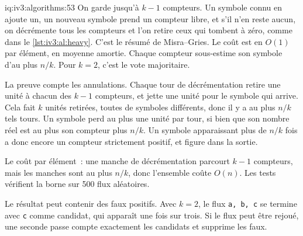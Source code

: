 \begin{solution}{iq:iv3:algorithms:53}
On garde jusqu'à $k - 1$ compteurs. Un symbole connu en ajoute un, un nouveau symbole prend un compteur libre, et s'il n'en reste aucun, on décrémente tous les compteurs et l'on retire ceux qui tombent à zéro, comme dans le \cref{lst:iv3:al:heavy}. C'est le résumé de Misra--Gries. Le coût est en $O(1)$ par élément, en moyenne amortie. Chaque compteur sous-estime son symbole d'au plus $n/k$. Pour $k = 2$, c'est le vote majoritaire.
\label{lst:iv3:al:heavy}

La preuve compte les annulations. Chaque tour de décrémentation retire une unité à chacun des $k - 1$ compteurs, et jette une unité pour le symbole qui arrive. Cela fait $k$ unités retirées, toutes de symboles différents, donc il y a au plus $n / k$ tels tours. Un symbole perd au plus une unité par tour, si bien que son nombre réel est au plus son compteur plus $n / k$. Un symbole apparaissant plus de $n/k$ fois a donc encore un compteur strictement positif, et figure dans la sortie.

Le coût par élément~: une manche de décrémentation parcourt $k - 1$ compteurs, mais les manches sont au plus $n / k$, donc l'ensemble coûte $O(n)$. Les tests vérifient la borne sur 500 flux aléatoires.

Le résultat peut contenir des faux positifs. Avec $k = 2$, le flux \texttt{a, b, c} se termine avec \texttt{c} comme candidat, qui apparaît une fois sur trois. Si le flux peut être rejoué, une seconde passe compte exactement les candidats et supprime les faux.

\end{solution}

